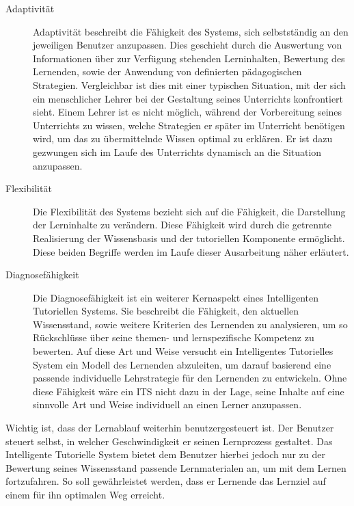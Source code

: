 \begin{description}
	\item[Adaptivität]
  Adaptivität beschreibt die Fähigkeit des Systems, sich selbstständig an den
  jeweiligen Benutzer anzupassen. Dies geschieht durch die Auswertung von
  Informationen über zur Verfügung stehenden Lerninhalten, Bewertung des Lernenden, sowie
  der Anwendung von definierten pädagogischen Strategien.
  Vergleichbar ist dies mit einer typischen Situation, mit der sich ein
  menschlicher Lehrer bei der Gestaltung seines Unterrichts konfrontiert sieht.
  Einem Lehrer ist es nicht möglich, während der Vorbereitung seines Unterrichts
  zu wissen, welche Strategien er später im Unterricht benötigen wird, um
  das zu übermittelnde Wissen optimal zu erklären. Er ist dazu gezwungen sich
  im Laufe des Unterrichts dynamisch an die Situation anzupassen.

	\item[Flexibilität]
  Die Flexibilität des Systems bezieht sich auf die Fähigkeit, die Darstellung
  der Lerninhalte zu verändern. Diese Fähigkeit wird durch die getrennte
  Realisierung der Wissensbasis und der tutoriellen Komponente ermöglicht.
  Diese beiden Begriffe werden im Laufe dieser Ausarbeitung näher erläutert.

	\item[Diagnosefähigkeit]
  Die Diagnosefähigkeit ist ein weiterer Kernaspekt eines Intelligenten Tutoriellen Systems.
  Sie beschreibt die Fähigkeit, den aktuellen Wissensstand, sowie weitere Kriterien
  des Lernenden zu analysieren, um so Rückschlüsse über seine themen- und lernspezifische
  Kompetenz zu bewerten.
  Auf diese Art und Weise versucht ein Intelligentes Tutorielles System ein Modell des
  Lernenden abzuleiten, um darauf basierend eine passende individuelle Lehrstrategie
  für den Lernenden zu entwickeln.
  Ohne diese Fähigkeit wäre ein ITS nicht dazu in der Lage,
  seine Inhalte auf eine sinnvolle Art und Weise individuell an einen Lerner anzupassen.
\end{description}

Wichtig ist, dass der Lernablauf weiterhin benutzergesteuert ist. Der Benutzer steuert
selbst, in welcher Geschwindigkeit er seinen Lernprozess gestaltet.
Das Intelligente Tutorielle System bietet dem Benutzer hierbei jedoch nur zu
der Bewertung seines Wissensstand passende Lernmaterialen an, um mit dem Lernen
fortzufahren. So soll gewährleistet werden, dass er Lernende das Lernziel auf einem
für ihn optimalen Weg erreicht.

